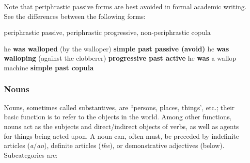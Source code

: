 \documentclass[12pt]{article}
\begin{document}
\noindent Note that periphrastic passive forms are best avoided in formal academic writing. See the differences between the following forms:
\begin{exe}
\ex periphrastic passive, periphrastic progressive, non-periphrastic copula
    \begin{xlist}
    \ex he \textbf{was walloped} (by the walloper) \hfill \textbf{simple past passive (avoid)}
    \ex he \textbf{was walloping} (against the clobberer) \hfill \textbf{progressive past active}
    \ex he \textbf{was} a wallop machine \hfill \textbf{simple past copula}
    \end{xlist}
\end{exe}

\subsubsection{Nouns}

Nouns, sometimes called substantives, are ``persons, places, things', etc.; their basic function is to refer to the objects in the world. Among other functions, nouns act as the subjects and direct/indirect objects of verbs, as well as agents for things being acted upon. A noun can, often must, be preceded by indefinite articles (\textit{a}/\textit{an}), definite articles (\textit{the}), or demonstrative adjectives (below). Subcategories are:
\end{document}
